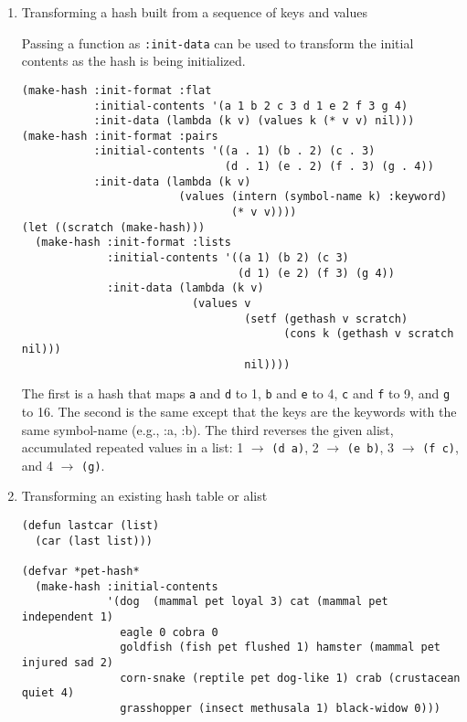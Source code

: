 \documentclass[11pt]{article}
\begin{document}
\begin{enumerate}
\begin{verbatim}
(with-open-file (s "config.ini" :direction :input :if-does-not-exist nil)
  (make-hash :test #'equal :init-format :function
             :initial-contents #'parse-ini-line :init-data (list s)))
\end{verbatim}
\item Transforming a hash built from a sequence of keys and values

     Passing a function as \texttt{:init-data} can be used to
     transform the initial contents as the hash is being initialized.


\begin{verbatim}
(make-hash :init-format :flat
           :initial-contents '(a 1 b 2 c 3 d 1 e 2 f 3 g 4)
           :init-data (lambda (k v) (values k (* v v) nil)))
(make-hash :init-format :pairs
           :initial-contents '((a . 1) (b . 2) (c . 3)
                               (d . 1) (e . 2) (f . 3) (g . 4))
           :init-data (lambda (k v)
                        (values (intern (symbol-name k) :keyword)
                                (* v v))))
(let ((scratch (make-hash)))
  (make-hash :init-format :lists
             :initial-contents '((a 1) (b 2) (c 3)
                                 (d 1) (e 2) (f 3) (g 4))
             :init-data (lambda (k v)
                          (values v
                                  (setf (gethash v scratch)
                                        (cons k (gethash v scratch nil)))
                                  nil))))
\end{verbatim}




     The first is a hash that maps \texttt{a} and \texttt{d} to 1, \texttt{b} and \texttt{e} to 4, \texttt{c} and \texttt{f} to 9,
     and \texttt{g} to 16. The second is the same except that the keys are the
     keywords with the same symbol-name (e.g., :a, :b). The third 
     reverses the given alist, accumulated repeated values in a list:
     1 $\to$ \texttt{(d a)}, 2 $\to$ \texttt{(e b)}, 3 $\to$ \texttt{(f c)}, and 4 $\to$ \texttt{(g)}.
\item Transforming an existing hash table or alist


\begin{verbatim}
(defun lastcar (list)
  (car (last list)))

(defvar *pet-hash*
  (make-hash :initial-contents
             '(dog  (mammal pet loyal 3) cat (mammal pet independent 1)
               eagle 0 cobra 0
               goldfish (fish pet flushed 1) hamster (mammal pet injured sad 2)
               corn-snake (reptile pet dog-like 1) crab (crustacean quiet 4)
               grasshopper (insect methusala 1) black-widow 0)))


\end{verbatim}
\end{enumerate}
\end{document}

